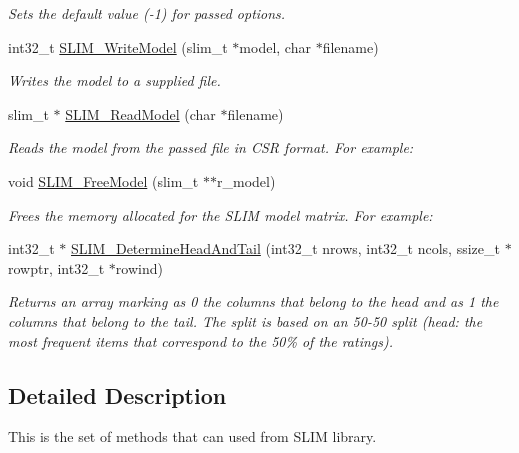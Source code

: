 \begin{DoxyCompactItemize}
\begin{DoxyCompactList}\small\item\em Sets the default value (-\/1) for passed options. \end{DoxyCompactList}\item 
int32\+\_\+t \hyperlink{group__slimapi_ga4a73297a1dcf82ed110a1bb349120f2a}{S\+L\+I\+M\+\_\+\+Write\+Model} (slim\+\_\+t $\ast$model, char $\ast$filename)
\begin{DoxyCompactList}\small\item\em Writes the model to a supplied file. \end{DoxyCompactList}\item 
slim\+\_\+t $\ast$ \hyperlink{group__slimapi_ga6ee60da1ee298e093723e9dfd9f21f1c}{S\+L\+I\+M\+\_\+\+Read\+Model} (char $\ast$filename)
\begin{DoxyCompactList}\small\item\em Reads the model from the passed file in C\+SR format. For example\+: \end{DoxyCompactList}\item 
void \hyperlink{group__slimapi_ga2224ba0f1e06e728423bcf5c63da5fea}{S\+L\+I\+M\+\_\+\+Free\+Model} (slim\+\_\+t $\ast$$\ast$r\+\_\+model)
\begin{DoxyCompactList}\small\item\em Frees the memory allocated for the S\+L\+IM model matrix. For example\+: \end{DoxyCompactList}\item 
\mbox{\label{group__slimapi_ga05d2e5468a86da7251b57f4289701401}} 
int32\+\_\+t $\ast$ \hyperlink{group__slimapi_ga05d2e5468a86da7251b57f4289701401}{S\+L\+I\+M\+\_\+\+Determine\+Head\+And\+Tail} (int32\+\_\+t nrows, int32\+\_\+t ncols, ssize\+\_\+t $\ast$rowptr, int32\+\_\+t $\ast$rowind)
\begin{DoxyCompactList}\small\item\em Returns an array marking as 0 the columns that belong to the head and as 1 the columns that belong to the tail. The split is based on an 50-\/50 split (head\+: the most frequent items that correspond to the 50\% of the ratings). \end{DoxyCompactList}\end{DoxyCompactItemize}


\subsection{Detailed Description}
This is the set of methods that can used from S\+L\+IM library. 

